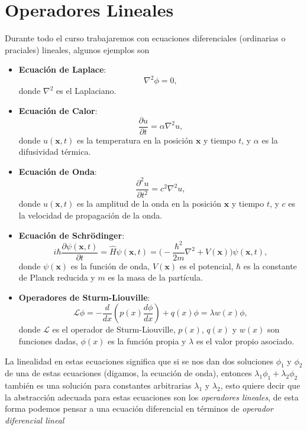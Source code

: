 \documentclass[letterpaper]{book}
\begin{document}
\section{Operadores Lineales}
\noindent Durante todo el curso trabajaremos con ecuaciones diferenciales (ordinarias o praciales) lineales, algunos ejemplos son
\begin{itemize}
    \item \textbf{Ecuación de Laplace}:
    \[
    \nabla^2 \phi = 0,
    \]
    donde \(\nabla^2\) es el Laplaciano.

    \item \textbf{Ecuación de Calor}:
    \[
    \frac{\partial u}{\partial t} = \alpha \nabla^2 u,
    \]
    donde \(u(\mathbf{x}, t)\) es la temperatura en la posición \(\mathbf{x}\) y tiempo \(t\), y \(\alpha\) es la difusividad térmica.

    \item \textbf{Ecuación de Onda}:
    \[
    \frac{\partial^2 u}{\partial t^2} = c^2 \nabla^2 u,
    \]
    donde \(u(\mathbf{x}, t)\) es la amplitud de la onda en la posición \(\mathbf{x}\) y tiempo \(t\), y \(c\) es la velocidad de propagación de la onda.

    \item \textbf{Ecuación de Schrödinger}:
   \[
   i\hbar \frac{\partial \psi(\mathbf{x}, t)}{\partial t} = \hat{H} \psi(\mathbf{x}, t)= \Big(-\frac{\hbar^2}{2m}\nabla^2+V(\mathbf{x})\Big)\psi(\mathbf{x}, t),
   \]
    donde \(\psi(\mathbf{x})\) es la función de onda, \(V(\mathbf{x})\) es el potencial, \(\hbar\) es la constante de Planck reducida y \(m\) es la masa de la partícula.

    \item \textbf{Operadores de Sturm-Liouville}:
    \[
    \mathcal{L} \phi = -\frac{d}{dx} \left( p(x) \frac{d\phi}{dx} \right) + q(x) \phi = \lambda w(x) \phi,
    \]
    donde \(\mathcal{L}\) es el operador de Sturm-Liouville, \(p(x)\), \(q(x)\) y \(w(x)\) son funciones dadas, \(\phi(x)\) es la función propia y \(\lambda\) es el valor propio asociado.
\end{itemize}

\noindent La linealidad en estas ecuaciones significa que si se nos dan dos soluciones \(\phi_1\) y \(\phi_2\) de una de estas ecuaciones (digamos, la ecuación de onda), entonces \(\lambda_1 \phi_1 + \lambda_2 \phi_2\) también es una solución para constantes arbitrarias \(\lambda_1\) y \(\lambda_2\), esto quiere decir que la abstracción adecuada para estas ecuaciones son los \emph{operadores lineales}, de esta forma podemos pensar a una ecuación diferencial en términos de \emph{operador diferencial lineal}
\end{document}
